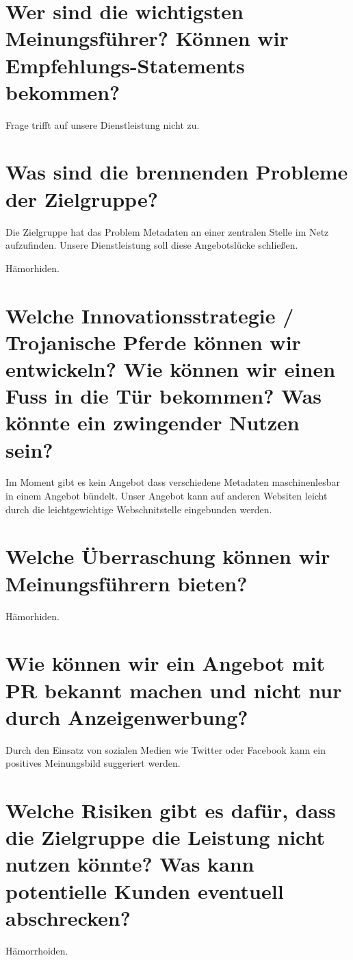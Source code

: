 \documentclass[11pt]{scrreprt}
\begin{document}
\section{Wer sind die wichtigsten Meinungsführer?
Können wir Empfehlungs-Statements bekommen?}
Frage trifft auf unsere Dienstleistung nicht zu.



\section{Was sind die brennenden Probleme der
Zielgruppe?}
Die Zielgruppe hat das Problem Metadaten an einer zentralen Stelle im Netz
aufzufinden. Unsere Dienstleistung soll diese Angebotslücke schließen.


Hämorhiden.

\section{Welche Innovationsstrategie / Trojanische
Pferde können wir entwickeln?
Wie können wir einen Fuss in die Tür
bekommen?
Was könnte ein zwingender Nutzen sein?}
Im Moment gibt es kein Angebot dass verschiedene Metadaten maschinenlesbar 
in einem Angebot bündelt. Unser Angebot kann auf anderen Websiten leicht durch
die leichtgewichtige Webschnitstelle eingebunden werden.


\section{Welche Überraschung können wir
Meinungsführern bieten?}


Hämorhiden.

\section{Wie können wir ein Angebot mit PR bekannt
machen und nicht nur durch
Anzeigenwerbung?}

Durch den Einsatz von sozialen Medien wie Twitter oder Facebook kann ein
positives Meinungsbild suggeriert werden.


\section{Welche Risiken gibt es dafür, dass die Zielgruppe
die Leistung nicht nutzen könnte?
Was kann potentielle Kunden eventuell
abschrecken?}

Hämorrhoiden.
\end{document}
